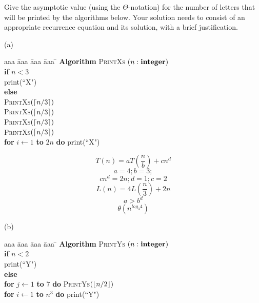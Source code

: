 \documentclass[11pt]{article}
\begin{document}

\medskip


\newcommand*{\Comb}[2]{{}^{#1}C_{#2}}%


\begin{problem}
Give the asymptotic value (using the $\Theta$-notation)
for the number of letters that will be printed by the algorithms below.
Your solution needs to consist of an appropriate recurrence 
equation and its solution, with a brief justification.

\bigskip
\noindent
(a)\ \ 
\begin{minipage}[t]{3in}
\begin{tabbing}
aaa \= aaa \= aaa \= aaa \=  \kill
\textbf{Algorithm} \textsc{PrintXs} $(n: \mbox{\bf integer})$ \\
          \> \textbf{if} $n < 3$ \\
          \>\>  print(``X") \\
          \>\textbf{else} \\
          \>\>  \textsc{PrintXs}$({\left\lceil n/3\right\rceil})$\\
          \>\>  \textsc{PrintXs}$({\left\lceil n/3\right\rceil})$\\
          \>\>  \textsc{PrintXs}$({\left\lceil n/3\right\rceil})$\\
          \>\>  \textsc{PrintXs}$({\left\lceil n/3\right\rceil})$\\
      \>\> \textbf{for} $i \leftarrow 1$ \textbf{to} $2n$ \textbf{do} print(``X")
\end{tabbing}
\end{minipage}

\begin{solution}
\[ T(n) = aT( \frac{n}{b} ) + cn^{d} \]
\[ a = 4; b = 3; \]
\[ cn^{d} = 2n; d = 1; c = 2 \]
\[ L(n) = 4L( \frac{n}{3} ) + 2n \]
\[ a > b^{d} \]
\[ \theta(n^{log_{3}4}) \]
\end{solution}

\bigskip
\noindent
(b)\ \
\begin{minipage}[t]{3in}
\begin{tabbing}
aaa \= aaa \= aaa \= aaa \=  \kill
\textbf{Algorithm} \textsc{PrintYs} $(n: \mbox{\bf integer})$ \\
          \> \textbf{if} $n < 2$ \\
          \>\>  print(``Y") \\
          \>\textbf{else} \\
          \>\>  \textbf{for} $j \leftarrow 1$ \textbf{to} $7$ 
					\textbf{do} \textsc{PrintYs}$({\left\lfloor n/2\right\rfloor})$\\
      \>\> \textbf{for} $i \leftarrow 1$ \textbf{to} $n^3$ \textbf{do} print(``Y")
\end{tabbing}
\end{minipage}


\end{problem}
\end{document}
